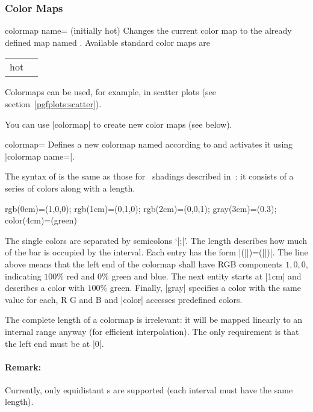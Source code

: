 \subsubsection{Color Maps}
\label{pgfplots:colormap}
\begin{pgfplotskey}{colormap name= (initially hot)}
	Changes the current color map to the already defined map named . Available standard color maps are

	\begin{tabular}{>{\ttfamily}ll}
	hot & \pgfplotsshowcolormap{hot}\\
	\end{tabular}

	Colormaps can be used, for example, in scatter plots (see section~\ref{pgfplots:scatter}).

	You can use |colormap| to create new color maps (see below).
\end{pgfplotskey}

\begin{pgfplotskey}{colormap=}
	Defines a new colormap named  according to  and activates it using |colormap name=|.
	
	The syntax of  is the same as those for \PGF\ shadings described in~\cite[VIII -- Shadings]{tikz}: it consists of a series of colors along with a length.
\begin{codeexample}
rgb(0cm)=(1,0,0); rgb(1cm)=(0,1,0); rgb(2cm)=(0,0,1); gray(3cm)=(0.3);  color(4cm)=(green)
\end{codeexample}

\noindent The single colors are separated by semicolons `|;|'. The length describes how much of the bar is occupied by the interval. Each entry has the form |(||)=(||)|. The line above means that the left end of the colormap shall have RGB components $1,0,0$, indicating $100\%$ red and $0\%$ green and blue. The next entity starts at |1cm| and describes a color with $100\%$ green. Finally, |gray| specifies a color with the same value for each, R G and B and |color| accesses predefined colors.

The complete length of a colormap is irrelevant: it will be mapped linearly to an internal range anyway (for efficient interpolation). The only requirement is that the left end must be at |0|.

\paragraph{Remark:} Currently, only equidistant s are supported (each interval must have the same length).
\end{pgfplotskey}


